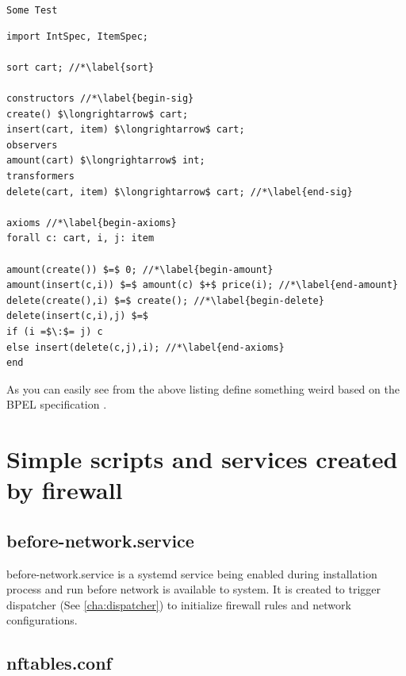 \documentclass[mscthesis]{usiinfthesis}
\begin{document}
\texttt{Some Test}
\begin{lstlisting}
import IntSpec, ItemSpec;

sort cart; //*\label{sort}

constructors //*\label{begin-sig}
create() $\longrightarrow$ cart;
insert(cart, item) $\longrightarrow$ cart;
observers
amount(cart) $\longrightarrow$ int;
transformers
delete(cart, item) $\longrightarrow$ cart; //*\label{end-sig}

axioms //*\label{begin-axioms}
forall c: cart, i, j: item 

amount(create()) $=$ 0; //*\label{begin-amount}
amount(insert(c,i)) $=$ amount(c) $+$ price(i); //*\label{end-amount}
delete(create(),i) $=$ create(); //*\label{begin-delete}
delete(insert(c,i),j) $=$
if (i =$\:$= j) c
else insert(delete(c,j),i); //*\label{end-axioms}
end
\end{lstlisting}

As you can easily see from the above listing \citet{bbggs:iet07}
define something weird based on the BPEL specification
\citep{bpelspec}.
\nocite{*}

\appendix %

\chapter{Simple scripts and services created by firewall}
\section{before-network.service}\label{sec:before-network-service}
before-network.service is a systemd service being enabled during installation process and run before network is available to system. It is created to trigger dispatcher (See \cref{cha:dispatcher}) to initialize firewall rules and network configurations.
\section{nftables.conf}\label{sec:nftables.conf}
\end{document}
